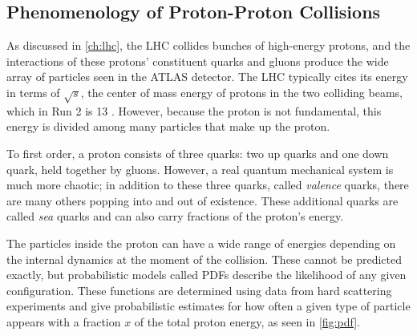 



\subsection{Phenomenology of Proton-Proton Collisions}
\label{sec:pp_collisions}

As discussed in \autoref{ch:lhc}, the \ac{LHC} collides bunches of high-energy protons, and the interactions of these protons' constituent quarks and gluons produce the wide array of particles seen in the \ac{ATLAS} detector. The \ac{LHC} typically cites its energy in terms of $\sqrt{s}$, the center of mass energy of protons in the two colliding beams, which in Run 2 is 13 \tev. However, because the proton is not fundamental, this energy is divided among many particles that make up the proton. 

To first order, a proton consists of three quarks: two up quarks and one down quark, held together by gluons. However, a real quantum mechanical system is much more chaotic; in addition to these three quarks, called \textit{valence} quarks, there are many others popping into and out of existence. These additional quarks are called \textit{sea} quarks and can also carry fractions of the proton's energy.

The particles inside the proton can have a wide range of energies depending on the internal dynamics at the moment of the collision. These cannot be predicted exactly, but probabilistic models called \acfp{PDF} describe the likelihood of any given configuration. These functions are determined using data from hard scattering experiments and give probabilistic estimates for how often a given type of particle appears with a fraction $x$ of the total proton energy, as seen in \autoref{fig:pdf}. 

